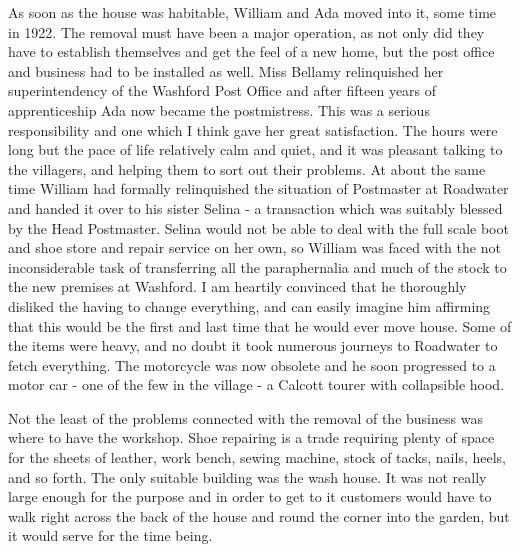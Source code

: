 As soon as the house was habitable, William and Ada moved into it, some time in 1922. The removal must have been a major operation, as not only did they have to establish themselves and get the feel of a new home, but the post office and business had to be installed as well. Miss Bellamy relinquished her superintendency of the Washford Post Office and after fifteen years of apprenticeship Ada now became the postmistress. This was a serious responsibility and one which I think gave her great satisfaction. The hours were long but the pace of life relatively calm and quiet, and it was pleasant talking to the villagers, and helping them to sort out their problems. At about the same time William had formally relinquished the situation of Postmaster at Roadwater and handed it over to his sister Selina - a transaction which was suitably blessed by the Head Postmaster. Selina would not be able to deal with the full scale boot and shoe store and repair service on her own, so William was faced with the not inconsiderable task of transferring all the paraphernalia and much of the stock to the new premises at Washford. I am heartily convinced that he thoroughly disliked the having to change everything, and can easily imagine him affirming that this would be the first and last time that he would ever move house. Some of the items were heavy, and no doubt it took numerous journeys to Roadwater to fetch everything. The  motorcycle was now obsolete and he soon progressed to a motor car - one of the few in the village - a Calcott tourer with collapsible hood.

Not the least of the problems connected with the removal of the business was where to have the workshop. Shoe repairing is a trade requiring plenty of space for the sheets of leather, work bench, sewing machine, stock of tacks, nails, heels, and so forth. The only suitable building was the wash house. It was not really large enough for the purpose and in order to get to it customers would have to walk right across the back of the house and round the corner into the garden, but it would serve for the time being.

